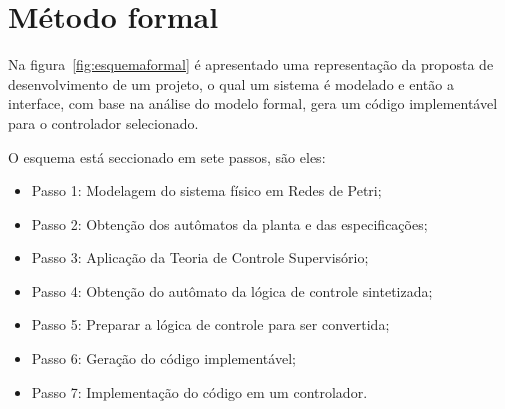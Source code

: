 \section{M\'etodo formal}

Na figura~\ref{fig:esquemaformal} é apresentado uma representa\c{c}\~ao da proposta de desenvolvimento de um projeto, o qual um sistema \'e modelado e ent\~ao a interface, com base na an\'alise do modelo formal, gera um c\'odigo implement\'avel para o controlador selecionado. 

 O esquema est\'a seccionado em sete passos, s\~ao eles:
 
 \begin{itemize}
 	\item Passo 1: Modelagem do sistema f\'isico em Redes de Petri;
 	\item Passo 2: Obten\c{c}\~ao dos aut\^omatos da planta e das especifica\c{c}\~oes;
 	\item Passo 3: Aplica\c{c}\~ao da Teoria de Controle Supervis\'orio;
 	\item Passo 4: Obten\c{c}\~ao do aut\^omato da l\'ogica de controle sintetizada;
 	\item Passo 5: Preparar a l\'ogica de controle para ser convertida;
 	\item Passo 6: Gera\c{c}\~ao do c\'odigo implement\'avel;
 	\item Passo 7: Implementa\c{c}\~ao do c\'odigo em um controlador.
 \end{itemize}

